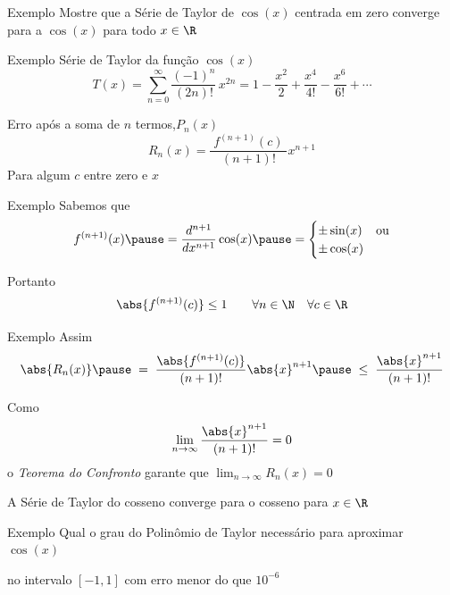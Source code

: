 \documentclass[fleqn,utf8,aspectratio=169,12pt]{beamer}
\begin{document}
\addtocounter{exemplo}{1}
\begin{frame}{Exemplo \theexemplo}
  Mostre que a Série de Taylor de \(\cos(x)\) centrada em zero
  converge para a \(\cos(x)\) para todo
  \(x\in\R\)
\end{frame}

\begin{frame}{Exemplo \theexemplo}
  Série de Taylor da função \(\cos(x)\)
  \[
    T(x)
    = \sum_{n=0}^{\infty} \frac{(-1)^n}{(2n)!}\, x^{2n}
    = 1 - \frac{x^2}{2}
    + \frac{x^4}{4!}
    - \frac{x^6}{6!}
    + \cdots
  \]

  \pause
  Erro após a soma de $n$ termos,\(P_n(x)\)
  \[
    R_n(x) = \frac{\;f^{(n+1)}(c)\;}{(n+1)!}x^{n+1}
  \]
  Para algum $c$ entre zero e $x$
\end{frame}

\begin{frame}{Exemplo \theexemplo}
  Sabemos que
  \[
    f^{(n+1)}(x)
    \pause
    = \frac{d^{n+1}}{dx^{n+1}} \cos(x)
    \pause
    = \begin{cases}
       \pm \sin(x) & \text{ou} \\
       \pm \cos(x)
    \end{cases}
  \]

  \pause
  \vspace{\baselineskip}
  Portanto
  \[
    \abs{f^{(n+1)}(c)} \leq 1
    \qquad
    \forall n\in\N
    \quad
    \forall c\in\R
  \]
\end{frame}

\begin{frame}{Exemplo \theexemplo}
  Assim
  \[
    \abs{R_n(x)}
    \pause
    \;=\;    \frac{\abs{f^{(n+1)}(c)}}{(n+1)!}\abs{x}^{n+1}
    \pause
    \;\leq\; \frac{\abs{x}^{n+1}}{(n+1)!}
  \]

  \pause
  Como
  \[
    \lim_{n\to\infty} \frac{\abs{x}^{n+1}}{(n+1)!} = 0
  \]
  \pause
  o \emph{Teorema do Confronto} garante que
  \(
    \lim_{n\to\infty} R_n(x) = 0
  \)

  \pause
  A Série de Taylor do cosseno converge para o cosseno para \(x\in\R\)
\end{frame}

\addtocounter{exemplo}{1}
\begin{frame}{Exemplo \theexemplo}
  Qual o grau do Polinômio de Taylor necessário para aproximar \(\cos(x)\)

  no intervalo \([-1, 1]\) com erro menor do que \(10^{-6}\)
\end{frame}
\end{document}
